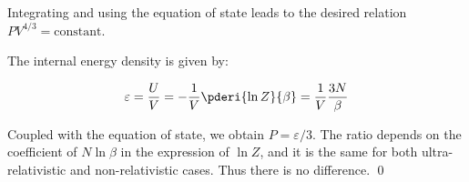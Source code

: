 \documentclass[12pt]{article}
\begin{document}
Integrating and using the equation of state leads to the desired relation $PV^{4/3} = \text{constant}$.

The internal energy density is given by:

\begin{equation}
    \varepsilon = \frac{U}{V} = - \frac{1}{V} \pderi{\ln{Z}}{\beta} = \frac{1}{V} \frac{3N}{\beta}
\end{equation}

Coupled with the equation of state, we obtain $P = \varepsilon/3$. The ratio depends on the coefficient of $N\ln{\beta}$ in the expression of $\ln{Z}$, and it is the same for both ultra-relativistic and non-relativistic cases. Thus there is no difference.
\qed
\end{document}
